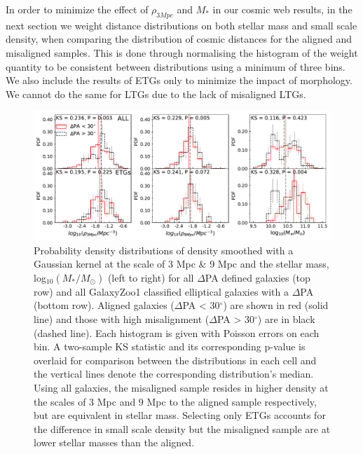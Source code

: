 In order to minimize the effect of $\rho_{3Mpc}$ and $M_{\ast}$ in our cosmic web results, in the next section we weight distance distributions on both stellar mass and small scale density, when comparing the distribution of cosmic distances for the aligned and misaligned samples. This is done through normalising the histogram of the weight quantity to be consistent between distributions using a minimum of three bins. We also include the results of ETGs only to minimize the impact of morphology. We cannot do the same for LTGs due to the lack of misaligned LTGs. 

\begin{figure}
    \centering
	\includegraphics[width=\linewidth]{thesis/latex/halo_assembly_manga/PA_ALL_ET_DENSITY.pdf}
    \caption[Probability density distributions of density smoothed with a Gaussian kernel at the scale of 3 Mpc \& 9 Mpc and the stellar mass, log$_{10}(M_{\ast}/M_{\odot})$ for all $\Delta$PA defined galaxies and all GalaxyZoo1 classified elliptical galaxies with a $\Delta$PA.]{Probability density distributions of density smoothed with a Gaussian kernel at the scale of 3 Mpc \& 9 Mpc and the stellar mass, log$_{10}(M_{\ast}/M_{\odot})$ (left to right) for all $\Delta$PA defined galaxies (top row) and all GalaxyZoo1 classified elliptical galaxies with a $\Delta$PA (bottom row). Aligned galaxies ($\Delta$PA < 30$^{\circ}$) are shown in red (solid line) and those with high misalignment ($\Delta$PA > 30$^{\circ}$) are in black (dashed line). Each histogram is given with Poisson errors on each bin. A two-sample KS statistic and its corresponding p-value is overlaid for comparison between the distributions in each cell and the vertical lines denote the corresponding distribution's median. Using all galaxies, the misaligned sample resides in higher density at the scales of 3 Mpc and 9 Mpc to the aligned sample respectively, but are equivalent in stellar mass. Selecting only ETGs accounts for the difference in small scale density but the misaligned sample are at lower stellar masses than the aligned.}
    \label{fig:density_hab}
\end{figure}


